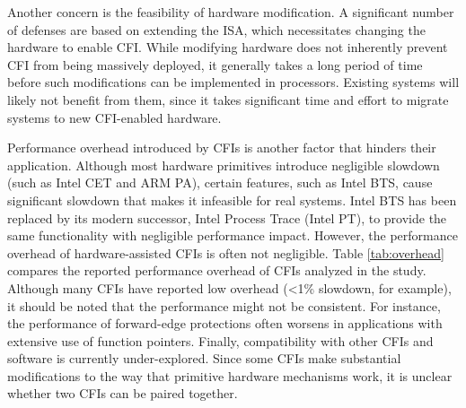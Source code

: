 \documentclass[journal,onecolumn]{IEEEtran}
\begin{document}
Another concern is the feasibility of hardware modification. A significant number of defenses are based on extending the ISA, which necessitates changing the hardware to enable CFI. While modifying hardware does not inherently prevent CFI from being massively deployed, it generally takes a long period of time before such modifications can be implemented in processors. Existing systems will likely not benefit from them, since it takes significant time and effort to migrate systems to new CFI-enabled hardware.

Performance overhead introduced by CFIs is another factor that hinders their application. Although most hardware primitives introduce negligible slowdown (such as Intel CET and ARM PA), certain features, such as Intel BTS, cause significant slowdown that makes it infeasible for real systems. Intel BTS has been replaced by its modern successor, Intel Process Trace (Intel PT), to provide the same functionality with negligible performance impact\cite{IntelProcessorTrace}. However, the performance overhead of hardware-assisted CFIs is often not negligible. Table \ref{tab:overhead} compares the reported performance overhead of CFIs analyzed in the study. Although many CFIs have reported low overhead (<1\% slowdown, for example), it should be noted that the performance might not be consistent. For instance, the performance of forward-edge protections often worsens in applications with extensive use of function pointers. Finally, compatibility with other CFIs and software is currently under-explored. Since some CFIs make substantial modifications to the way that primitive hardware mechanisms work, it is unclear whether two CFIs can be paired together.
\end{document}
